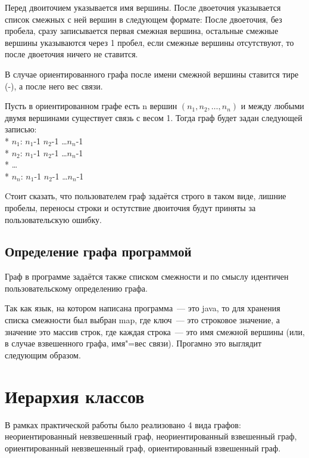 \documentclass[bachelor, och, pract]{SCWorks}
\begin{document}
Перед двоиточием указывается имя вершины. После двоеточия указывается список
смежных с ней вершин в следующем формате: После двоеточия, без пробела, сразу
записывается первая смежная вершина, остальные смежные вершины указываются через
1 пробел, если смежные вершины отсутствуют, то после двоеточия ничего не ставится.
\bigskip

В случае ориентированного графа после имени смежной вершины ставится тире (-),
а после него вес связи.
\bigskip

Пусть в ориентированном графе есть n вершин $(n_1, n_2, \dots, n_n)$ и между любыми
двумя вершинами существует связь с весом 1. Тогда граф будет задан следующей записью:\\*
$n_1$: $n_1$-1 $n_2$-1 \dots $n_n$-1\\*
$n_2$: $n_1$-1 $n_2$-1 \dots $n_n$-1\\*
\dots \\*
$n_n$: $n_1$-1 $n_2$-1 \dots $n_n$-1\\
\bigskip

Cтоит сказать, что пользователем граф задаётся строго в таком виде, лишние
пробелы, переносы строки и остутствие двоиточия будут приняты за пользовательскую ошибку.
\bigskip

\subsection{Определение графа программой}

Граф в программе задаётся также списком смежности и по смыслу
идентичен пользовательскому определению графа.
\bigskip

Так как язык, на котором написана программа~--- это java, то
для хранения списка смежности был выбран map, где ключ~---
это строковое значение, а значение это массив строк,
где каждая строка~--- это имя смежной вершины (или, в случае взвешенного графа,
имя"=вес связи). Прогамно это выглядит следующим образом.
\bigskip


\bigskip

\section{Иерархия классов}

В рамках практической работы было реализовано 4 вида графов:
неориентированный невзвешенный граф, неориентированный взвешенный граф,
ориентированный невзвешенный граф, ориентированный взвешенный граф.
\end{document}
